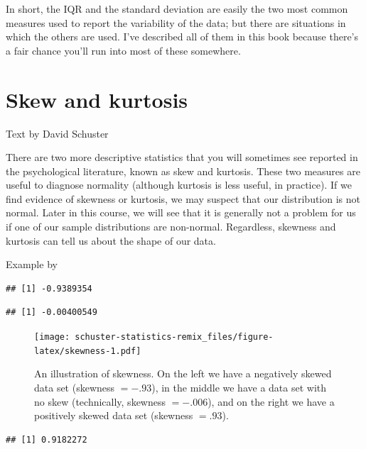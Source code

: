 \documentclass[
]{book}
\begin{document}
In short, the IQR and the standard deviation are easily the two most common measures used to report the variability of the data; but there are situations in which the others are used. I've described all of them in this book because there's a fair chance you'll run into most of these somewhere.

\hypertarget{skewandkurtosis}{%
\section{Skew and kurtosis}\label{skewandkurtosis}}

Text by David Schuster

There are two more descriptive statistics that you will sometimes see reported in the psychological literature, known as skew and kurtosis. These two measures are useful to diagnose normality (although kurtosis is less useful, in practice). If we find evidence of skewness or kurtosis, we may suspect that our distribution is not normal. Later in this course, we will see that it is generally not a problem for us if one of our sample distributions are non-normal. Regardless, skewness and kurtosis can tell us about the shape of our data.

Example by \citet{Navarro2018}

\begin{verbatim}
## [1] -0.9389354
\end{verbatim}

\begin{verbatim}
## [1] -0.00400549
\end{verbatim}

\begin{figure}
\centering
\texttt{[image: schuster-statistics-remix\_files/figure-latex/skewness-1.pdf]}
\caption{\label{fig:skewness}An illustration of skewness. On the left we have a negatively skewed data set (skewness \(= -.93\)), in the middle we have a data set with no skew (technically, skewness \(= -.006\)), and on the right we have a positively skewed data set (skewness \(= .93\)).}
\end{figure}

\begin{verbatim}
## [1] 0.9182272
\end{verbatim}
\end{document}

